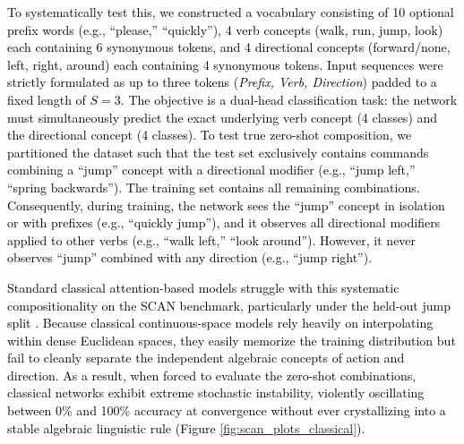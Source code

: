 \documentclass[11pt, a4paper]{article}
\begin{document}
\textcolor{black}{To systematically test this, we constructed a vocabulary consisting of 10 optional prefix words (e.g., ``please,'' ``quickly''), 4 verb concepts (walk, run, jump, look) each containing 6 synonymous tokens, and 4 directional concepts (forward/none, left, right, around) each containing 4 synonymous tokens. Input sequences were strictly formulated as up to three tokens (\textit{Prefix, Verb, Direction}) padded to a fixed length of $S=3$. The objective is a dual-head classification task: the network must simultaneously predict the exact underlying verb concept (4 classes) and the directional concept (4 classes). To test true zero-shot composition, we partitioned the dataset such that the test set exclusively contains commands combining a ``jump'' concept with a directional modifier (e.g., ``jump left,'' ``spring backwards''). The training set contains all remaining combinations. Consequently, during training, the network sees the ``jump'' concept in isolation or with prefixes (e.g., ``quickly jump''), and it observes all directional modifiers applied to other verbs (e.g., ``walk left,'' ``look around''). However, it never observes ``jump'' combined with any direction (e.g., ``jump right'').}

\textcolor{black}{Standard classical attention-based models struggle with this systematic compositionality on the SCAN benchmark, particularly under the held-out jump split \cite{lake2018generalization}. Because classical continuous-space models rely heavily on interpolating within dense Euclidean spaces, they easily memorize the training distribution but fail to cleanly separate the independent algebraic concepts of action and direction. As a result, when forced to evaluate the zero-shot combinations, classical networks exhibit extreme stochastic instability, violently oscillating between 0\% and 100\% accuracy at convergence without ever crystallizing into a stable algebraic linguistic rule (Figure \ref{fig:scan_plots_classical}).}
\end{document}
